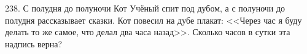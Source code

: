 238. С полудня до полуночи Кот Учёный спит под дубом, а с полуночи до полудня рассказывает сказки. Кот повесил на дубе плакат: <<Через час я буду делать то же самое, что делал два часа назад>>. Сколько часов в сутки эта надпись верна?\\
